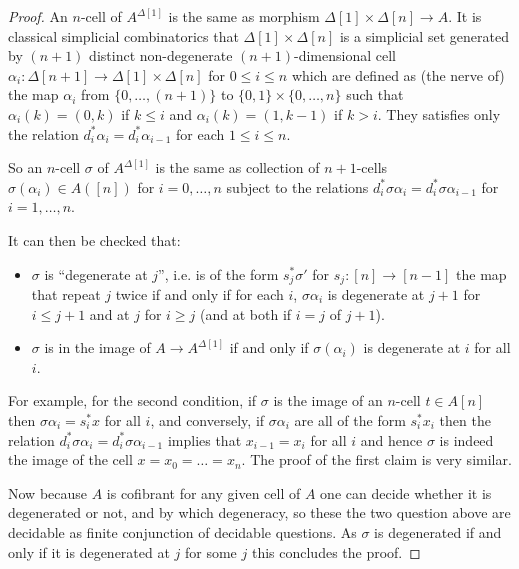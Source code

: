 \documentclass[reqno,10pt,a4paper,oneside,draft]{amsart}
\begin{document}
\begin{proof}
An $n$-cell of $A^{\Delta[1]}$ is the same as morphism $\Delta[1] \times \Delta[n] \rightarrow A$. It is classical simplicial combinatorics that $\Delta[1] \times \Delta[n]$ is a simplicial set generated by $(n+1)$ distinct non-degenerate $(n+1)$-dimensional cell $\alpha_i: \Delta[n+1] \rightarrow \Delta[1] \times \Delta[n]$ for $0 \leqslant i \leqslant n$ which are defined as (the nerve of) the map $\alpha_i$ from $\{0,\dots,(n+1)\}$ to $\{0,1\} \times \{0,\dots,n\}$ such that $\alpha_i(k)=(0,k)$ if $k \leqslant i$ and $\alpha_i(k)=(1,k-1)$ if $k>i$. They satisfies only the relation $d_i^* \alpha_i = d_{i}^* \alpha_{i-1}$ for each $1 \leqslant i \leqslant n$.

So an $n$-cell $\sigma$ of $A^{\Delta[1]}$ is the same as collection of $n+1$-cells $\sigma(\alpha_i) \in A([n])$ for $i=0,\dots,n$ subject to the relations $d_i^* \sigma \alpha_i = d_{i}^* \sigma \alpha_{i-1}$ for $i=1,\dots,n$.


It can then be checked that:

\begin{itemize}

\item $\sigma$ is ``degenerate at $j$'', i.e. is of the form $s_j ^* \sigma'$ for $s_j : [n] \rightarrow [n-1]$ the map that repeat $j$ twice if and only if for each $i$, $\sigma \alpha_i $ is degenerate at $j+1$ for $i \leqslant j+1$ and at $j$ for $i \geqslant j$ (and at both if $i=j$ of $j+1$).

\item $\sigma$ is in the image of $A \rightarrow A^{\Delta[1]}$ if and only if $\sigma(\alpha_i)$ is degenerate at $i$ for all $i$.

\end{itemize}


For example, for the second condition, if $\sigma$ is the image of an $n$-cell $t \in A[n]$ then $\sigma \alpha_i = s_i^* x$ for all $i$, and conversely, if $\sigma \alpha_i$ are all of the form $s_i^* x_i$ then the relation $d_i^* \sigma \alpha_i = d_{i}^* \sigma \alpha_{i-1}$ implies that $x_{i-1}=x_i$ for all $i$ and hence $\sigma$ is indeed the image of the cell $x=x_0= \dots = x_n$. The proof of the first claim is very similar.

Now because $A$ is cofibrant for any given cell of $A$ one can decide whether it is degenerated or not, and by which degeneracy, so these the two question above are decidable as finite conjunction of decidable questions. As $\sigma$ is degenerated if and only if it is degenerated at $j$ for some $j$ this concludes the proof.
\end{proof}
\end{document}
